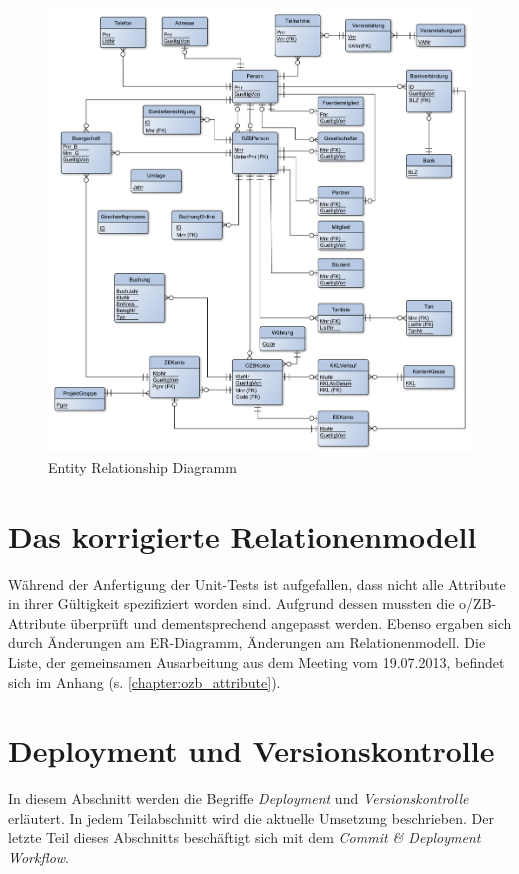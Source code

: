 \documentclass[12pt,             %
               a4paper,          %
               listof=totoc,     %
               index=totoc,      %
               bibliography=totoc,%
               oneside,         %
               BCOR1cm,          %
               english   %
               ]{scrbook}
\begin{document}
\begin{figure}[H]
     \begin{center}
          \includegraphics[width=\textwidth]{Media/er_diagramm.pdf}
     \end{center}
     \caption{Entity Relationship Diagramm}
     \label{fig:er_diagramm}
\end{figure} 


\section{Das korrigierte Relationenmodell}
Während der Anfertigung der Unit-Tests ist aufgefallen, dass nicht alle Attribute in ihrer Gültigkeit spezifiziert worden sind. Aufgrund dessen mussten die o/ZB-Attribute überprüft und dementsprechend angepasst werden. Ebenso ergaben sich durch Änderungen am ER-Diagramm, Änderungen am Relationenmodell. Die Liste, der gemeinsamen Ausarbeitung aus dem Meeting vom 19.07.2013, befindet sich im Anhang (s. \vref{chapter:ozb_attribute}).

\section{Deployment und Versionskontrolle}
In diesem Abschnitt werden die Begriffe \textit{Deployment} und \textit{Versionskontrolle} erläutert. In jedem Teilabschnitt wird die aktuelle Umsetzung beschrieben. Der letzte Teil dieses Abschnitts beschäftigt sich mit dem \textit{Commit \& Deployment Workflow}.
\end{document}
